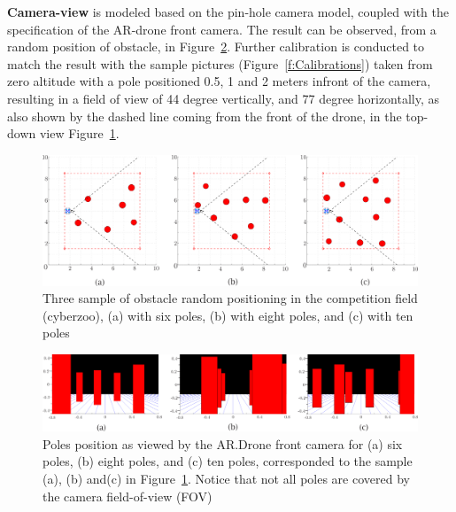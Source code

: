 \textbf{Camera-view} is modeled based on the pin-hole camera model, coupled with the specification of the AR-drone front camera. The result can be observed, from a random position of obstacle, in Figure~\ref{f:CameraViewSamples}. Further calibration is conducted to match the result with the sample pictures (Figure~\ref{f:Calibrations}) taken from zero altitude with a pole positioned 0.5, 1 and 2 meters infront of the camera, resulting in a field of view of 44 degree vertically, and 77 degree horizontally, as also shown by the dashed line coming from the front of the drone, in the top-down view Figure~\ref{f:TopViewSamples}. 

\begin{figure}[h]
\includegraphics[width=1\linewidth]{Figures/TopViewSamples_3.png}
\centering
\caption{Three sample of obstacle random positioning in the competition field (cyberzoo), (a) with six poles, (b) with eight poles, and (c) with ten poles}
\label{f:TopViewSamples}
\end{figure} 

\begin{figure}[h]
\includegraphics[width=1\linewidth]{Figures/CameraViewSamples_3.png}
\centering
\caption{Poles position as viewed by the AR.Drone front camera for (a) six poles, (b) eight poles, and (c) ten poles, corresponded to the sample (a), (b) and(c) in Figure~\ref{f:TopViewSamples}. Notice that not all poles are covered by the camera field-of-view (FOV)}
\label{f:CameraViewSamples}
\end{figure} 

